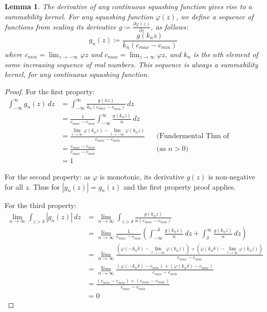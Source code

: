 \documentclass{article} %
\newtheorem{lem}[thm]{Lemma}
\newcommand{\dlim}{\displaystyle\lim}
\begin{document}
\begin{lem}\label{lem:squashderivissum}
	The derivative of any continuous squashing function gives rise to a summability kernel.
	For any squashing function $\varphi(z)$,
	we define a sequence of functions from scaling its derivative 
    $g \coloneqq \frac{\partial\varphi(z)}{\partial z}$, as follows:
	\begin{equation}
	g_n(z) \coloneqq \frac{g(k_n z)}{k_n\left( c_{max} - c_{min} \right)} 
	\end{equation}
	 where $c_{min}=\lim_{z \to -\infty} \varphi{z}$ and $c_{max}=\lim_{z \to \infty} \varphi{z}$,
	 and $k_n$ is the $n$th element of some increasing sequence of real numbers.
	This sequence is always a summability kernel, for any continuous squashing function.
	

\end{lem}
\begin{proof}
For the first property:
\begin{align}
	\int_{-\infty}^{\infty} g_n(z) \, dz &=  \int_{-\infty}^{\infty} \frac{g(nz)}{k_n\left( c_{max} - c_{min} \right)} \, dz \\
	&= \frac{1}{c_{max} - c_{min}} \int_{-\infty}^{\infty} \frac{g(k_n z)}{n} \, dz \\
	&= \frac{\dlim_{t \to \infty} \varphi(k_n z) - \dlim_{t \to -\infty} \varphi(k_n z)}{c_{max} - c_{min}} && \text{(Fundermental Thm of Calculus)}\\
	&= \frac{c_{max} - c_{min}}{c_{max} - c_{min}}  && \text{(as $n>0$)}\\
	&= 1	
\end{align}
	
For the second property: as  $\varphi$ is monotonic, its derivative $g(z)$ is non-negative for all $z$. Thus for $|g_n(z)|=g_n(z)$ and the first property proof applies.

For the third property:
\begin{align}
	\lim_{n\to\infty} \int_{z>\delta} |g_n(z)|\, dz 
	 &= \lim_{n\to\infty} \int_{z>\delta} \frac{g(k_n z)}{n\left( c_{max} - c_{min} \right)} \\
	 &= \lim_{n\to\infty} \frac{1}{c_{max} - c_{min}} 
		 \left( \int_{-\infty}^{-\delta} \frac{g(k_n z)}{n} \, dz 
		 + \int_\delta^\infty \frac{g(k_n z)}{n} \, dz \right) \\
	 &= \lim_{n\to\infty} \frac{
	 	\left(\varphi(-k_n\delta)-\dlim_{t \to -\infty} \varphi(k_n z)\right)
	 	 + \left( \varphi(k_n\delta) - \dlim_{t \to \infty} \varphi(k_n z)\right)}%
	 	 {c_{max} - c_{min}} \\
	 &= \lim_{n\to\infty} \frac{
	 	\left(\varphi(-k_n\delta)-c_{min} \right)
	 	+ \left( \varphi(k_n\delta) - c_{max} \right)}%
	    {c_{max} - c_{min}} \\
	 &= \frac{
	 	\left(c_{min}-c_{min} \right)
	 	+ \left(c_{max} - c_{max} \right)}%
		{c_{max} - c_{min}} \\
	 &= 0
\end{align}

\end{proof}
\end{document}

